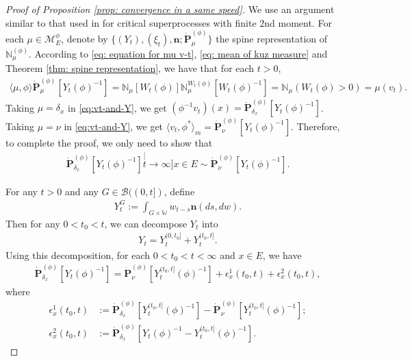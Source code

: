 \begin{proof}[Proof of Proposition \ref{prop: convergence in a same speed}]
	We use an argument similar to that used in \cite{RenSongSun2017Spine} for critical superprocesses with finite 2nd moment.
	For each $\mu\in\mathcal M^\phi_E$, denote by $\{(Y_t), (\xi_t),\mathbf n; \dot {\mathbf P}^{(\phi)}_\mu\}$ the spine representation of $\mathbb N^{(\phi)}_\mu$.
	According to \eqref	{eq: equation for mu v-t}, \eqref{eq: mean of kuz measure} and Theorem \ref{thm: spine representation},
	we have that for each $t>0$,
\begin{align}\label{eq:vt-and-Y}
	\langle \mu,\phi \rangle \dot {\mathbf P}^{(\phi)}_\mu [Y_t(\phi)^{-1}]
	= \mathbb N_\mu[W_t(\phi)] \mathbb N^{W_t(\phi)}_\mu [W_t(\phi)^{-1}]
	= \mathbb N_\mu(W_t(\phi) > 0)
	= \mu(v_t).
\end{align}
	Taking $\mu = \delta_x$ in \eqref{eq:vt-and-Y}, we get $(\phi^{-1}v_t)(x) =\dot{\mathbf P}_{\delta_x}^{(\phi)}[Y_t(\phi)^{-1}]$.
	Taking $\mu = \nu$ in \eqref{eq:vt-and-Y}, we get $\langle v_t, \phi^*\rangle_m = \dot {\mathbf P}_{\nu}^{(\phi)} [Y_t(\phi)^{-1}]$.
	Therefore, to complete the proof, we only need to show that
\begin{align}
	\dot{\mathbf P}_{\delta_x}^{(\phi)}[Y_t(\phi)^{-1}]
	\stackrel[t\to \infty]{x\in E}{\sim}  \dot {\mathbf P}_\nu^{(\phi)} [Y_t(\phi)^{-1}].
\end{align}

	For any $t>0$ and any $G\in \mathscr B((0,t])$, define
\begin{align}
	Y^G_t
	:= \int_{G\times \mathbb W} w_{t-s} \mathbf n(ds,dw).
\end{align}
	Then for any $0 < t_0 < t$, we can decompose $Y_t$ into
\begin{align}
	Y_t
	= Y^{(0,t_0]}_t + Y^{(t_0,t]}_t.
\end{align}
	Using this decomposition, for each $0<t_0<t<\infty$ and $x\in E$, we have
\begin{align}\label{eq: starting point of phi-1v_t(x)}
	 \dot{\mathbf P}_{\delta_x}^{(\phi)}[Y_t(\phi)^{-1}]
	= \dot {\mathbf P}_\nu^{(\phi)} [Y^{(t_0,t]}_t(\phi)^{-1}] + \epsilon_x^1(t_0,t) +\epsilon_x^2(t_0,t),
\end{align}
	where
\begin{align}
	\epsilon_x^1(t_0,t)
	&:= \dot {\mathbf P}_{\delta_x}^{(\phi)} [Y^{(t_0,t]}_t(\phi)^{-1}] - \dot {\mathbf P}_\nu^{(\phi)} [Y^{(t_0,t]}_t(\phi)^{-1}];
	\\\epsilon_x^2(t_0,t)
	&:= \dot{\mathbf P}_{\delta_x}^{(\phi)}[Y_t(\phi)^{-1} - Y^{(t_0,t]}_t(\phi)^{-1}].
\end{align}


\end{proof}
